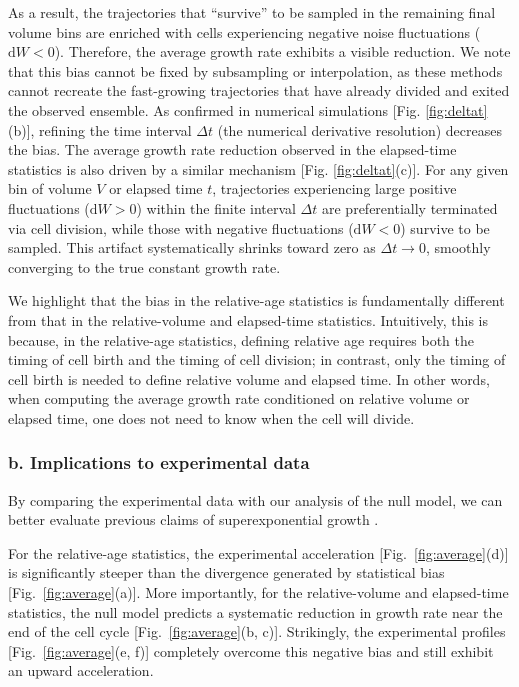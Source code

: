 \documentclass[aps, prl, longbibliography, linenumbers, superscriptaddress]{revtex4-2}
\begin{document}
As a result, the trajectories that “survive” to be sampled in the remaining final volume bins are enriched with cells experiencing negative noise fluctuations ($\mathrm{d}W < 0$). Therefore, the average growth rate exhibits a visible reduction. We note that this bias cannot be fixed by subsampling or interpolation, as these methods cannot recreate the fast-growing trajectories that have already divided and exited the observed ensemble. As confirmed in numerical simulations [Fig. \ref{fig:deltat}(b)], refining the time interval $\Delta t$ (the numerical derivative resolution) decreases the bias. The average growth rate reduction observed in the elapsed-time statistics is also driven by a similar mechanism [Fig. \ref{fig:deltat}(c)]. For any given bin of volume $V$ or elapsed time $t$, trajectories experiencing large positive fluctuations ($\mathrm{d}W > 0$) within the finite interval $\Delta t$ are preferentially terminated via cell division, while those with negative fluctuations ($\mathrm{d}W < 0$) survive to be sampled. This artifact systematically shrinks toward zero as $\Delta t \to 0$, smoothly converging to the true constant growth rate.
	
We highlight that the bias in the relative-age statistics is fundamentally different from that in the relative-volume and elapsed-time statistics. Intuitively, this is because, in the relative-age statistics, defining relative age requires both the timing of cell birth and the timing of cell division; in contrast, only the timing of cell birth is needed to define relative volume and elapsed time. In other words, when computing the average growth rate conditioned on relative volume or elapsed time, one does not need to know when the cell will divide.

\subsubsection{b. Implications to experimental data}
By comparing the experimental data with our analysis of the null model, we can better evaluate previous claims of superexponential growth \cite{Kar2021distinguishing, Cylke2023super, Cylke2025gene}. 

For the relative-age statistics, the experimental acceleration [Fig.~\ref{fig:average}(d)] is significantly steeper than the divergence generated by statistical bias [Fig.~\ref{fig:average}(a)]. More importantly, for the relative-volume and elapsed-time statistics, the null model predicts a systematic reduction in growth rate near the end of the cell cycle [Fig.~\ref{fig:average}(b, c)]. Strikingly, the experimental profiles [Fig.~\ref{fig:average}(e, f)] completely overcome this negative bias and still exhibit an upward acceleration.
\end{document}
